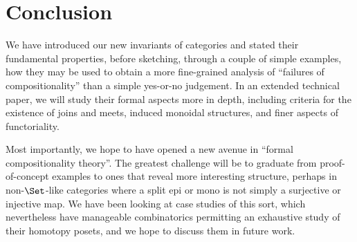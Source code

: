 \section*{Conclusion}

We have introduced our new invariants of categories and stated their fundamental properties, before sketching, through a couple of simple examples, how they may be used to obtain a more fine-grained analysis of ``failures of compositionality'' than a simple yes-or-no judgement.
In an extended technical paper, we will study their formal aspects more in depth, including criteria for the existence of joins and meets, induced monoidal structures, and finer aspects of functoriality.

Most importantly, we hope to have opened a new avenue in ``formal compositionality theory''.
The greatest challenge will be to graduate from proof-of-concept examples to ones that reveal more interesting structure, perhaps in non-$\Set$-like categories where a split epi or mono is not simply a surjective or injective map.
We have been looking at case studies of this sort, which nevertheless have manageable combinatorics permitting an exhaustive study of their homotopy posets, and we hope to discuss them in future work.